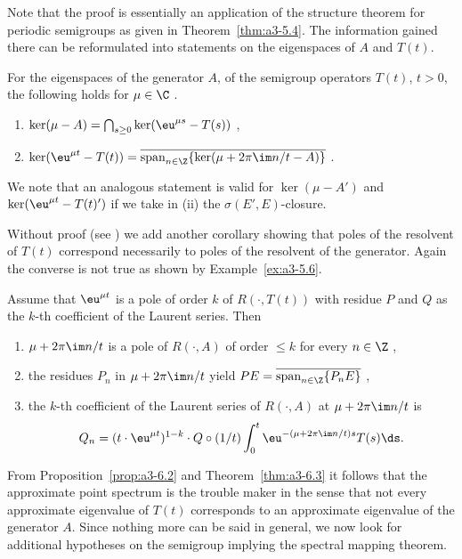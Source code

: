 Note that the proof is essentially an application of the structure theorem for periodic semigroups as given in Theorem~\ref{thm:a3-5.4}.
The information gained there can be reformulated into statements on the eigenspaces of\/ $A$ and $T(t)$.
\begin{corollary}\label{cor:a3-6.4}
For the eigenspaces of the generator $A$, \resp of the semigroup operators $T(t)$, $t > 0$, the following holds  for  $\mu \in \C$ .
\begin{enumerate}[\upshape (i)]
\item 
$\ker(\mu - A) = \bigcap_{s \geq 0} \ker(\eu^{\mu s} - T(s))$ ,

\item 
$\ker(\eu^{\mu t} - T(t)) = \overline{\mathrm{span}_{n \in \Z} \{\ker(\mu + 2\pi\im  n/t - A)\}}$ .

\end{enumerate}
\end{corollary}
We note that an analogous statement is valid for $\ker(\mu - A')$ and $\ker(\eu^{\mu t} - T(t)')$ if we take in (ii) the $\sigma(E',E)$-closure.

Without proof (see \textcite[Proposition~1.10]{greiner:1981}) we add another corollary showing that poles of the resolvent of\/ $T(t)$ correspond necessarily to poles of the resolvent of the generator.
Again the converse is not true as shown by Example~\ref{ex:a3-5.6}.
\begin{corollary}\label{cor:a3-6.5}
Assume that $\eu^{\mu t}$ is a pole of order $k$ of\/ $R(\cdot,T(t))$ with residue $P$ and $Q$ as the $k$-th coefficient of the Laurent series.
Then
\begin{enumerate}[\upshape (i)]
\item 
$\mu + 2\pi\im  n/t$ is a pole of\/ $R(\cdot,A)$ of order $\leq k$ for every $n \in \Z$ ,

\item 
the residues $P_{n}$ in $\mu + 2\pi\im  n/t$ yield $PE = \overline{\text{span}_{n \in \Z} \{P_{n}E\}}$ ,

\item 
the $k$-th coefficient of the Laurent series of\/ $R(\cdot,A)$ at $\mu + 2\pi\im  n/t$ is
\[
Q_{n} = (t \cdot \eu^{\mu t})^{1-k} \cdot Q \circ (1/t) \int_{0}^{t} \eu^{-(\mu+2\pi\im  n/t)s}T(s) \ds .
\]
\end{enumerate}
\end{corollary}
From Proposition~\ref{prop:a3-6.2} and Theorem~\ref{thm:a3-6.3} it follows that the approximate point spectrum 
is the trouble maker in the sense that not every approximate eigenvalue of\/ $T(t)$ corresponds to an approximate eigenvalue of the generator $A$.
Since nothing more can be said in general, we now look for additional hypotheses on the semigroup implying the spectral mapping theorem.

